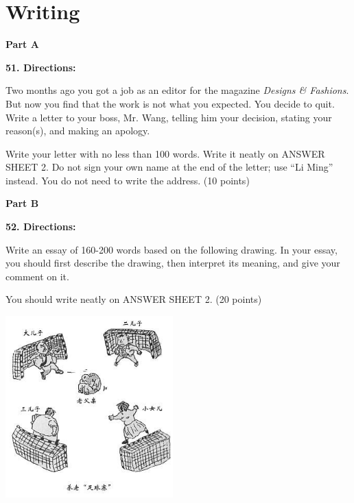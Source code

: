 
\section{Writing}
\textbf{Part A}

\textbf{51. Directions:}

\qquad Two months ago you got a job as an editor for the magazine \emph{Designs \& Fashions}. But now you find that the work is not what you expected. You decide to quit. Write a letter to your boss, Mr. Wang, telling him your decision, stating your reason(s), and making an apology.

\qquad Write your letter with no less than 100 words. Write it neatly on ANSWER SHEET 2. Do not sign your own name at the end of the letter; use ``Li Ming'' instead. You do not need to write the address. (10 points)

\vspace{10pt}

\textbf{Part B}

\textbf{52. Directions:}

\qquad Write an essay of 160-200 words based on the following drawing. In your essay, you should first describe the drawing, then interpret its meaning, and give your comment on it.

\qquad You should write neatly on ANSWER SHEET 2. (20 points)

\begin{center}\includegraphics[height=7cm]{8.jpg}\end{center}